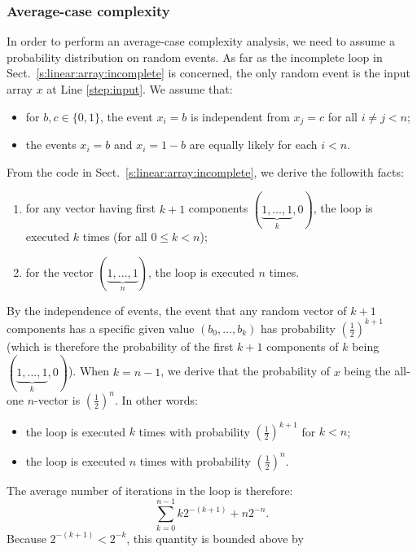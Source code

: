 \documentclass[a4paper]{book}
\theoremstyle{changebreak}                %
\begin{document}
\subsubsection{Average-case complexity}
In order to perform an average-case
complexity analysis, we need to assume
a probability distribution on random
events. As far as the incomplete loop in
Sect.~\ref{s:linear:array:incomplete} is concerned, the only random
event is the input array $x$ at Line \ref{step:input}. We assume that:
\begin{itemize}
\item for $b,c\in\{0,1\}$, the event $x_i=b$ is
  independent from $x_j=c$ for all $i\not=j<
  n$;
\item the events $x_i=b$ and $x_i=1-b$ are equally likely for each
  $i< n$.
\end{itemize}
From the code in Sect.~\ref{s:linear:array:incomplete}, we derive the
followith facts:
\begin{enumerate}
\item for any vector having first $k+1$ components
  $(\underbrace{1,\ldots,1}_{k},0)$, the loop is executed $k$ times
  (for all $0\le k<n$);\label{enum:k}
\item for the vector $(\underbrace{1,\ldots,1}_n)$, the loop is
  executed $n$ times.\label{enum:n}
\end{enumerate}
By the independence of events, the event
that any random vector of $k+1$ components has a specific given value
$(b_0,\ldots,b_k)$ has probability
$(\frac{1}{2})^{k+1}$ (which is therefore the probability of the first
$k+1$ components of $k$ being $(\underbrace{1,\ldots,1}_{k},0)$). When
$k=n-1$, we derive that the probability of $x$ being the all-one
$n$-vector is $(\frac{1}{2})^{n}$. In other words:
\begin{itemize}
\item the loop is executed $k$ times with probability
  $(\frac{1}{2})^{k+1}$ for $k<n$;
\item the loop is executed $n$ times with probability $(\frac{1}{2})^{n}
$.
\end{itemize}
The average number of iterations in the loop is therefore:
\begin{equation*}
  \sum_{k=0}^{n-1} k2^{-(k+1)} + n2^{-n}.
\end{equation*}
Because $2^{-(k+1)}<2^{-k}$, this quantity is bounded above by 
\end{document}
